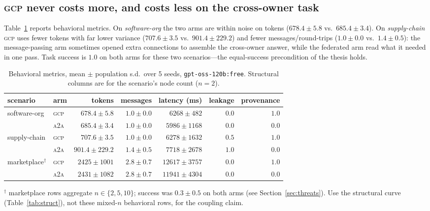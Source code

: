\documentclass[10pt,twocolumn,letterpaper]{article}
\newcommand{\gcp}{\textsc{gcp}}
\newcommand{\ata}{\textsc{a2a}}
\begin{document}
\subsection{\gcp{} never costs more, and costs less on the cross-owner task}
Table~\ref{tab:behav} reports behavioral metrics. On \emph{software-org} the two arms are within noise
on tokens ($678.4{\pm}5.8$ vs.\ $685.4{\pm}3.4$). On \emph{supply-chain} \gcp{} uses fewer tokens with
far lower variance ($707.6{\pm}3.5$ vs.\ $901.4{\pm}229.2$) and fewer messages/round-trips
($1.0{\pm}0.0$ vs.\ $1.4{\pm}0.5$): the message-passing arm sometimes opened extra connections to
assemble the cross-owner answer, while the federated arm read what it needed in one pass. Task success
is $1.0$ on both arms for these two scenarios---the equal-success precondition of the thesis holds.

\begin{table}[t]
\centering
\caption{Behavioral metrics, mean $\pm$ population s.d.\ over 5 seeds, \texttt{gpt-oss-120b:free}.
Structural columns are for the scenario's node count ($n{=}2$).}
\label{tab:behav}
\setlength{\tabcolsep}{4pt}
\begin{tabular}{llrrrrr}
\toprule
scenario & arm & tokens & messages & latency (ms) & leakage & provenance \\
\midrule
\multirow{2}{*}{software-org}
 & \gcp{} & $678.4{\pm}5.8$  & $1.0{\pm}0.0$ & $6268{\pm}482$  & $0.0$ & $1.0$ \\
 & \ata{} & $685.4{\pm}3.4$  & $1.0{\pm}0.0$ & $5986{\pm}1168$ & $0.0$ & $0.0$ \\
\midrule
\multirow{2}{*}{supply-chain}
 & \gcp{} & $707.6{\pm}3.5$   & $1.0{\pm}0.0$ & $6278{\pm}1632$ & $0.5$ & $1.0$ \\
 & \ata{} & $901.4{\pm}229.2$ & $1.4{\pm}0.5$ & $7718{\pm}2678$ & $1.0$ & $0.0$ \\
\midrule
\multirow{2}{*}{marketplace$^\dagger$}
 & \gcp{} & $2425{\pm}1001$ & $2.8{\pm}0.7$ & $12617{\pm}3757$ & $0.0$ & $1.0$ \\
 & \ata{} & $2431{\pm}1082$ & $2.8{\pm}0.7$ & $11941{\pm}4304$ & $0.0$ & $0.0$ \\
\bottomrule
\end{tabular}
\par\smallskip
\footnotesize $^\dagger$ marketplace rows aggregate $n\in\{2,5,10\}$; success was $0.3{\pm}0.5$
on both arms (see Section~\ref{sec:threats}). Use the structural curve (Table~\ref{tab:struct}),
not these mixed-$n$ behavioral rows, for the coupling claim.
\end{table}
\end{document}
